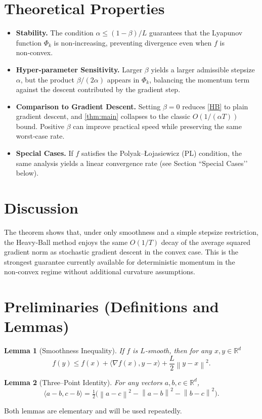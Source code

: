 \documentclass{article}
\newtheorem{lemma}{Lemma}
\newcommand{\R}{\mathbb{R}}
\newcommand{\norm}[1]{\left\lVert#1\right\rVert}
\begin{document}
\section*{Theoretical Properties}
\begin{itemize}
\item \textbf{Stability.}  The condition $\alpha\le(1-\beta)/L$ guarantees that the Lyapunov function $\Phi_{k}$ is non‑increasing, preventing divergence even when $f$ is non‑convex.
\item \textbf{Hyper‑parameter Sensitivity.}  Larger $\beta$ yields a larger admissible stepsize $\alpha$, but the product $\beta/(2\alpha)$ appears in $\Phi_{k}$, balancing the momentum term against the descent contributed by the gradient step.
\item \textbf{Comparison to Gradient Descent.}  Setting $\beta=0$ reduces \eqref{HB} to plain gradient descent, and \eqref{thm:main} collapses to the classic $O(1/(\alpha T))$ bound.  Positive $\beta$ can improve practical speed while preserving the same worst‑case rate.
\item \textbf{Special Cases.}  If $f$ satisfies the Polyak–Łojasiewicz (PL) condition, the same analysis yields a linear convergence rate (see Section “Special Cases’’ below).
\end{itemize}

\section*{Discussion}
The theorem shows that, under only smoothness and a simple stepsize restriction, the Heavy‑Ball method enjoys the same $O(1/T)$ decay of the average squared gradient norm as stochastic gradient descent in the convex case.  This is the strongest guarantee currently available for deterministic momentum in the non‑convex regime without additional curvature assumptions.

\newpage
\section*{Preliminaries (Definitions and Lemmas)}
\begin{lemma}[Smoothness Inequality]\label{lem:smooth}
If $f$ is $L$‑smooth, then for any $x,y\in\R^{d}$
\[
f(y)\le f(x)+\langle\nabla f(x),y-x\rangle+\frac{L}{2}\norm{y-x}^{2}. 
\]
\end{lemma}
\begin{lemma}[Three–Point Identity]\label{lem:3pt}
For any vectors $a,b,c\in\R^{d}$,
\[
\langle a-b,c-b\rangle =\tfrac12\bigl(\norm{a-c}^{2}-\norm{a-b}^{2}-\norm{b-c}^{2}\bigr).
\]
\end{lemma}
Both lemmas are elementary and will be used repeatedly.
\end{document}
